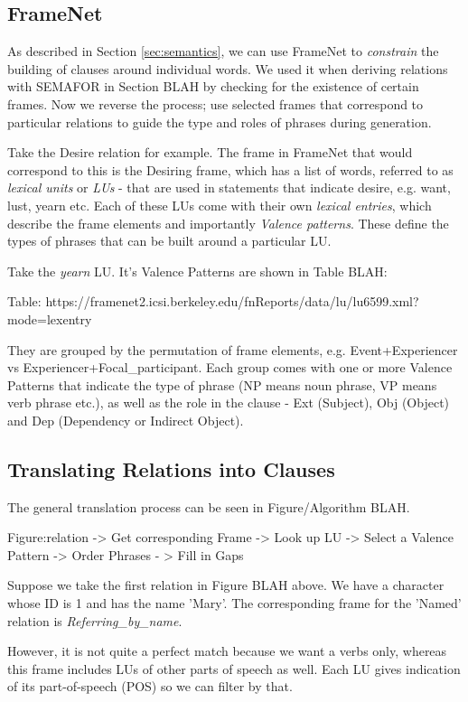 \subsection{FrameNet}

As described in Section \ref{sec:semantics}, we can use FrameNet to \textit{constrain} the building of clauses around individual words. We used it when deriving relations with SEMAFOR in Section BLAH by checking for the existence of certain frames. Now we reverse the process; use selected frames that correspond to particular relations to guide the type and roles of phrases during generation.

Take the Desire relation for example. The frame in FrameNet that would correspond to this is the Desiring frame, which has a list of words, referred to as \textit{lexical units} or \textit{LUs} - that are used in statements that indicate desire, e.g. want, lust, yearn etc. Each of these LUs come with their own \textit{lexical entries}, which describe the frame elements and importantly \textit{Valence patterns}. These define the types of phrases that can be built around a particular LU.

Take the \textit{yearn} LU. It's Valence Patterns are shown in Table BLAH:

Table: https://framenet2.icsi.berkeley.edu/fnReports/data/lu/lu6599.xml?mode=lexentry

They are grouped by the permutation of frame elements, e.g. Event+Experiencer vs Experiencer+Focal\_participant. Each group comes with one or more Valence Patterns that indicate the type of phrase (NP means noun phrase, VP means verb phrase etc.), as well as the role in the clause - Ext (Subject), Obj (Object) and Dep (Dependency or Indirect Object).

\subsection{Translating Relations into Clauses}

The general translation process can be seen in Figure/Algorithm BLAH.

Figure:relation -> Get corresponding Frame -> Look up LU -> Select a Valence Pattern -> Order Phrases - > Fill in Gaps

Suppose we take the first relation in Figure BLAH above. We have a character whose ID is 1 and has the name 'Mary'. The corresponding frame for the 'Named' relation is \textit{Referring\_by\_name}. 

However, it is not quite a perfect match because we want a verbs only, whereas this frame includes LUs of other parts of speech as well. Each LU gives indication of its part-of-speech (POS) so we can filter by that. 

